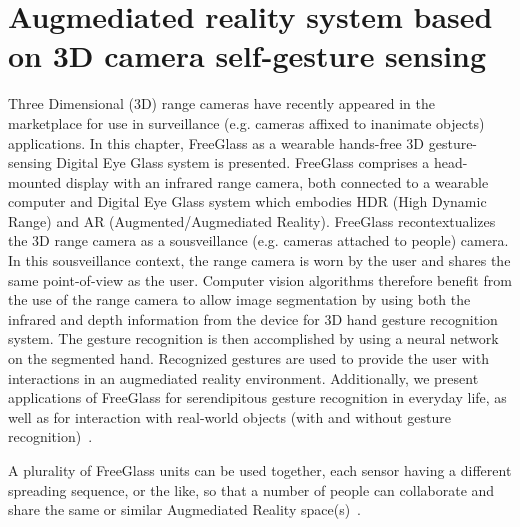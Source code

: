 \chapter{Augmediated reality system based on 3D camera self-gesture sensing}
\label{ar3dgesture}

Three Dimensional (3D) range cameras have recently appeared in the marketplace for use in surveillance
(e.g. cameras affixed to inanimate objects) applications. In this chapter, FreeGlass as a wearable hands-free 3D gesture-sensing Digital Eye Glass system is presented. FreeGlass comprises a head-mounted display with an infrared range camera, both connected to a wearable computer and Digital Eye Glass system which embodies HDR (High Dynamic Range) and AR (Augmented/Augmediated Reality). FreeGlass recontextualizes the 3D range camera as a sousveillance (e.g. cameras attached to people) camera. In this sousveillance context, the range camera is worn by the user and shares the same point-of-view as the user. Computer vision algorithms therefore benefit from the use of the range camera to allow image segmentation by using both the infrared and depth information from the device for 3D hand gesture recognition system. The gesture recognition is then accomplished by using a neural network on the segmented hand. Recognized gestures are used to provide the user with interactions in an augmediated reality environment. Additionally, we present applications of FreeGlass for serendipitous gesture recognition in everyday life, as well as for interaction with real-world objects (with and without gesture recognition)~\cite{buchmann2004fingartips,billinghurst2001collaboration,billinghurst2008tangible,kawashima2001magic}. 

A plurality of FreeGlass units can be used together, each sensor having a different spreading sequence, or the like, so that a number of people can collaborate and share the same or similar Augmediated Reality space(s)~\cite{billinghurst2002collaborative,billinghurst2000mixing}.

